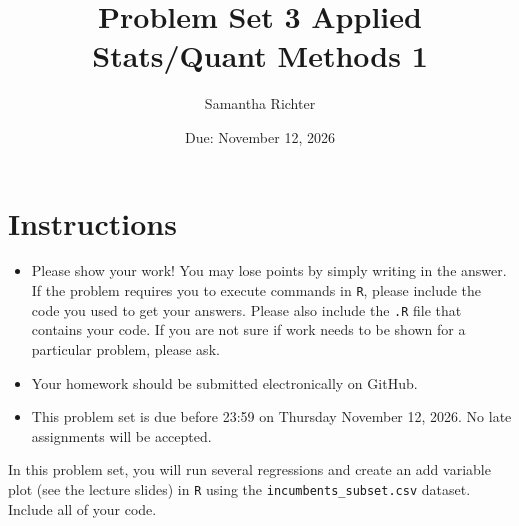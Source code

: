 \documentclass[12pt,letterpaper]{article}
\title{Problem Set 3
		Applied Stats/Quant Methods 1}
\date{Due: November 12, 2026}
\author{Samantha Richter}
\begin{document}
	\maketitle
	\section*{Instructions}
	\begin{itemize}
		\item Please show your work! You may lose points by simply writing in the answer. If the problem requires you to execute commands in \texttt{R}, please include the code you used to get your answers. Please also include the \texttt{.R} file that contains your code. If you are not sure if work needs to be shown for a particular problem, please ask.
	\item Your homework should be submitted electronically on GitHub.
	\item This problem set is due before 23:59 on Thursday November 12, 2026. No late assignments will be accepted.

	\end{itemize}

		\vspace{.25cm}
	
\noindent In this problem set, you will run several regressions and create an add variable plot (see the lecture slides) in \texttt{R} using the \texttt{incumbents\_subset.csv} dataset. Include all of your code.

	\vspace{.5cm}
\end{document}
